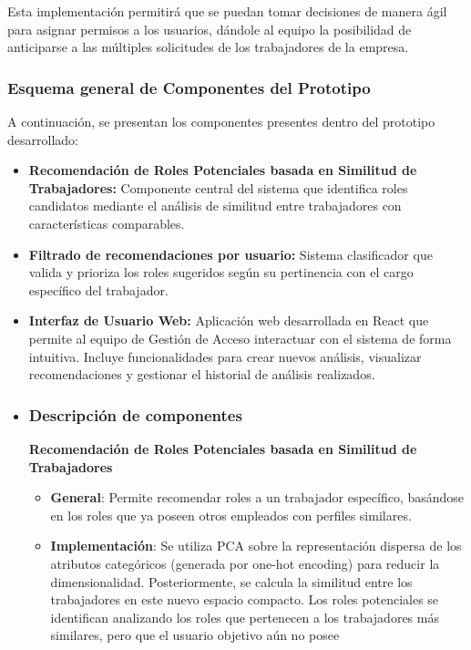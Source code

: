 \documentclass[11pt,letterpaper]{article}
\begin{document}
Esta implementación permitirá que se puedan tomar decisiones de manera
ágil para asignar permisos a los usuarios, dándole al equipo la
posibilidad de anticiparse a las múltiples solicitudes de los
trabajadores de la empresa.

\hypertarget{esquema-general-de-componentes-del-prototipo}{%
\subsubsection{Esquema general de Componentes del
Prototipo}\label{esquema-general-de-componentes-del-prototipo}}

A continuación, se presentan los componentes presentes dentro del
prototipo desarrollado:

\begin{itemize}
\item
  \textbf{Recomendación de Roles Potenciales basada en Similitud de Trabajadores:}
  Componente central del sistema que identifica roles candidatos mediante el análisis
  de similitud entre trabajadores con características comparables.
\item
  \textbf{Filtrado de recomendaciones por usuario:}
  Sistema clasificador que valida y prioriza los roles sugeridos según su pertinencia
  con el cargo específico del trabajador.
\item
  \textbf{Interfaz de Usuario Web:}
  Aplicación web desarrollada en React que permite al equipo de Gestión de Acceso
  interactuar con el sistema de forma intuitiva. Incluye funcionalidades para crear
  nuevos análisis, visualizar recomendaciones y gestionar el historial de análisis
  realizados.
\item

\hypertarget{descripciuxf3n-de-componentes}{%
\subsubsection{Descripción de
componentes}\label{descripciuxf3n-de-componentes}}

\textbf{Recomendación de Roles Potenciales basada en Similitud de Trabajadores}

\begin{itemize}
\tightlist
\item
  \textbf{General}: Permite recomendar roles a un trabajador específico,
  basándose en los roles que ya poseen otros empleados con perfiles
  similares.
\item
  \textbf{Implementación}: Se utiliza PCA sobre la representación
  dispersa de los atributos categóricos (generada por one-hot encoding)
  para reducir la dimensionalidad. Posteriormente, se calcula la
  similitud entre los trabajadores en este nuevo espacio compacto. Los
  roles potenciales se identifican analizando los roles que pertenecen a
  los trabajadores más similares, pero que el usuario objetivo aún no
  posee
\end{itemize}


\end{itemize}
\end{document}
